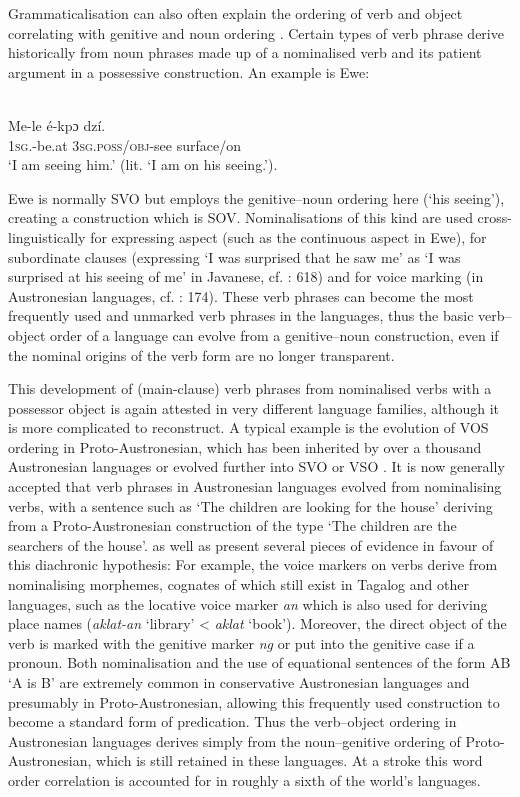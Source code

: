 \documentclass[output=paper]{langsci/langscibook}
\begin{document}
Grammaticalisation can also often explain the ordering of verb and object correlating with genitive and noun ordering \citep{Dryer2011}. Certain types of verb phrase derive historically from noun phrases made up of a nominalised verb and its patient argument in a possessive construction. An example is Ewe:

\ea

\\
\gll Me-le       é-kpɔ     dzí.\\
     \textsc{1sg}.-be.at  3\textsc{sg.poss/obj-}see   surface/on\\
\glt ‘I am seeing him.’ (lit. ‘I am on his seeing.’).
\z

Ewe is normally SVO but employs the genitive–noun ordering here (‘his seeing’), creating a construction which is SOV. Nominalisations of this kind are used cross-linguistically for expressing aspect (such as the continuous aspect in Ewe), for subordinate clauses (expressing ‘I was surprised that he saw me’ as ‘I was surprised at his seeing of me’ in Javanese, cf. \citealt{Ogloblin2005}: 618) and for voice marking (in Austronesian languages, cf. \citealt{Himmelmann2005}: 174). These verb phrases can become the most frequently used and unmarked verb phrases in the languages, thus the basic verb–object order of a language can evolve from a genitive–noun construction, even if the nominal origins of the verb form are no longer transparent. 

This development of (main-clause) verb phrases from nominalised verbs with a possessor object is again attested in very different language families, although it is more complicated to reconstruct. A typical example is the evolution of VOS ordering in Proto-Austronesian, which has been inherited by over a thousand Austronesian languages or evolved further into SVO or VSO \citep[7]{Adelaar2005}. It is now generally accepted that verb phrases in Austronesian languages evolved from nominalising verbs, with a sentence such as ‘The children are looking for the house’ deriving from a Proto-Austronesian construction of the type ‘The children are the searchers of the house’. \citet{StarostaEtAl1982} as well as \citet{Kaufman2009} present several pieces of evidence in favour of this diachronic hypothesis: For example, the voice markers on verbs derive from nominalising morphemes, cognates of which still exist in Tagalog and other languages, such as the locative voice marker \textit{an} which is also used for deriving place names (\textit{aklat-an} ‘library’ < \textit{aklat} ‘book’). Moreover, the direct object of the verb is marked with the genitive marker \textit{ng} or put into the genitive case if a pronoun. Both nominalisation and the use of equational sentences of the form AB ‘A is B’ are extremely common in conservative Austronesian languages and presumably in Proto-Austronesian, allowing this frequently used construction to become a standard form of predication. Thus the verb–object ordering in Austronesian languages derives simply from the noun–genitive ordering of Proto-Austronesian, which is still retained in these languages. At a stroke this word order correlation is accounted for in roughly a sixth of the world’s languages.
\end{document}
